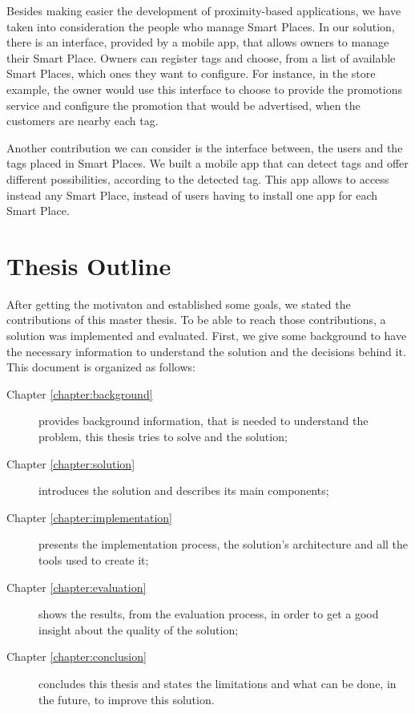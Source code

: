 Besides making easier the development of proximity-based applications, we have taken into consideration the people who manage Smart Places.
In our solution, there is an interface, provided by a mobile app, that allows owners to manage their Smart Place. Owners can register tags and choose, from a list of available Smart Places, which ones they want to configure.
For instance, in the store example, the owner would use this interface to choose to provide the promotions service and configure the promotion that would be advertised, when the customers are nearby each tag.

Another contribution we can consider is the interface between, the users and the tags placed in Smart Places.
We built a mobile app that can detect tags and offer different possibilities, according to the detected tag.
This app allows to access instead any Smart Place, instead of users having to install one app for each Smart Place.

\section{Thesis Outline}
\label{sec:introduction_thesis_outline}
After getting the motivaton and established some goals, we stated the contributions of this master thesis.
To be able to reach those contributions, a solution was implemented and evaluated.
First, we give some background to have the necessary information to understand the solution and the decisions behind it.
This document is organized as follows:
\begin{description}
  \item[Chapter \ref{chapter:background}]
  provides background information, that is needed to understand the problem, this thesis tries to solve and the solution;
  \item[Chapter \ref{chapter:solution}]
  introduces the solution and describes its main components;
  \item[Chapter \ref{chapter:implementation}]
  presents the implementation process, the solution's architecture and all the tools used to create it;
  \item[Chapter \ref{chapter:evaluation}]
  shows the results, from the evaluation process, in order to get a good insight about the quality of the solution;
  \item[Chapter \ref{chapter:conclusion}]
  concludes this thesis and states the limitations and what can be done, in the future, to improve this solution.
\end{description}
